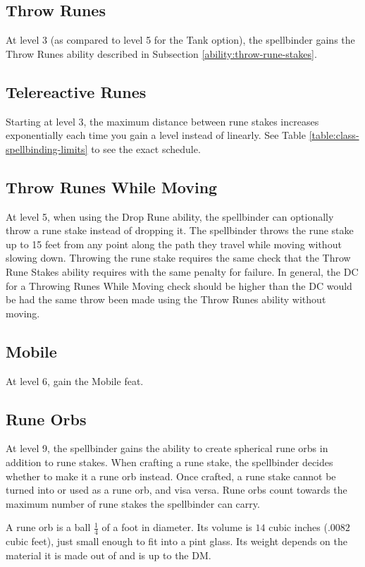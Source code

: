 \subsection{Throw Runes}
At level 3 (as compared to level 5 for the Tank option), the spellbinder gains the Throw Runes ability described in Subsection \ref{ability:throw-rune-stakes}.

\subsection{Telereactive Runes}
Starting at level 3, the maximum distance between rune stakes increases exponentially each time you gain a level instead of linearly. See Table \ref{table:class-spellbinding-limits} to see the exact schedule.

\subsection{Throw Runes While Moving}
At level 5, when using the Drop Rune ability, the spellbinder can optionally throw a rune stake instead of dropping it. The spellbinder throws the rune stake up to 15 feet from any point along the path they travel while moving without slowing down. Throwing the rune stake requires the same check that the Throw Rune Stakes ability requires with the same penalty for failure. In general, the DC for a Throwing Runes While Moving check should be higher than the DC would be had the same throw been made using the Throw Runes ability without moving.

\subsection{Mobile}
At level 6, gain the Mobile feat.

\subsection{Rune Orbs}
At level 9, the spellbinder gains the ability to create spherical rune orbs in addition to rune stakes. When crafting a rune stake, the spellbinder decides whether to make it a rune orb instead. Once crafted, a rune stake cannot be turned into or used as a rune orb, and visa versa. Rune orbs count towards the maximum number of rune stakes the spellbinder can carry.

A rune orb is a ball $\frac{1}{4}$ of a foot in diameter. Its volume is $14$ cubic inches ($.0082$ cubic feet), just small enough to fit into a pint glass. Its weight depends on the material it is made out of and is up to the DM.

